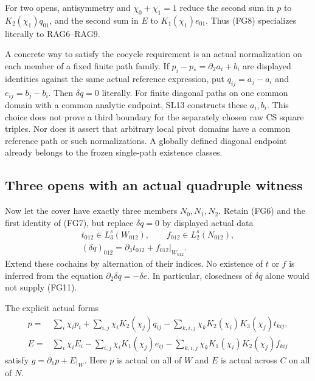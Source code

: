 For two opens, antisymmetry and $\chi_0+\chi_1=1$ reduce the second
sum in $p$ to $K_2(\chi_1)q_{01}$, and the second sum in $E$ to
$K_1(\chi_1)e_{01}$.  Thus (FG8) specializes literally to RAG6--RAG9.

A concrete way to satisfy the cocycle requirement is an actual
normalization on each member of a fixed finite path family.  If
$p_i-p_*=\partial_2a_i+b_i$ are displayed identities against the
same actual reference expression, put $q_{ij}=a_j-a_i$ and
$e_{ij}=b_j-b_i$.  Then $\delta q=0$ literally.  For finite diagonal
paths on one common domain with a common analytic endpoint, SL13
constructs these $a_i,b_i$.  This choice does not prove a third
boundary for the separately chosen raw CS square triples.  Nor does
it assert that arbitrary local pivot domains have a common reference
path or such normalizations.  A globally defined diagonal endpoint
already belongs to the frozen single-path existence classes.

\subsection{Three opens with an actual quadruple witness}

Now let the cover have exactly three members $N_0,N_1,N_2$.
Retain (FG6) and the first identity of (FG7), but replace $\delta q=0$
by displayed actual data
\[
 \begin{gathered}
 t_{012}\in L_3^s(W_{012}),\qquad
 f_{012}\in L_2^s(N_{012}),\\
                         (\delta q)_{012}
                         =\partial_3t_{012}+f_{012}|_{W_{012}}.
 \end{gathered}                                                    \tag{FG11}
\]
Extend these cochains by alternation of their indices.  No existence
of $t$ or $f$ is inferred from the equation
$\partial_2\delta q=-\delta e$.  In particular, closedness of
$\delta q$ alone would not supply (FG11).

\begin{theorem}
The explicit actual forms
\[
\begin{split}
 p={}&\sum_i\chi_i p_i+
       \sum_{i,j}\chi_iK_2(\chi_j)q_{ij}
       -\sum_{k,i,j}\chi_kK_2(\chi_i)K_3(\chi_j)t_{kij},\\
 E={}&\sum_i\chi_iE_i-
       \sum_{i,j}\chi_iK_1(\chi_j)e_{ij}
       -\sum_{k,i,j}\chi_kK_1(\chi_i)K_2(\chi_j)f_{kij}
\end{split}                                                       \tag{FG12}
\]
satisfy $g=\partial_1p+E|_W$.  Here $p$ is actual on all of $W$
and $E$ is actual across $C$ on all of $N$.
\end{theorem}

